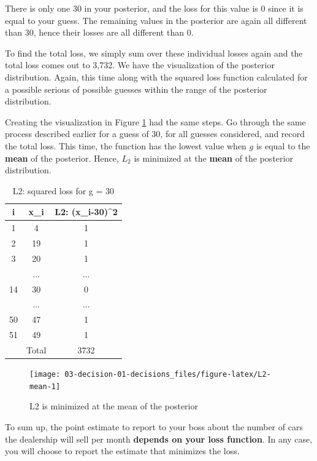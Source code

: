 \documentclass[]{book}
\theoremstyle{definition}
\theoremstyle{definition}
\theoremstyle{definition}
\theoremstyle{remark}
\begin{document}
There is only one 30 in your posterior, and the loss for this value is 0
since it is equal to your guess. The remaining values in the posterior
are again all different than 30, hence their losses are all different
than 0.

To find the total loss, we simply sum over these individual losses again
and the total loss comes out to 3,732. We have the visualization of the
posterior distribution. Again, this time along with the squared loss
function calculated for a possible serious of possible guesses within
the range of the posterior distribution.

Creating the visualization in Figure \ref{fig:L2-mean} had the same
steps. Go through the same process described earlier for a guess of 30,
for all guesses considered, and record the total loss. This time, the
function has the lowest value when \(g\) is equal to the \textbf{mean}
of the posterior. Hence, \(L_2\) is minimized at the \textbf{mean} of
the posterior distribution.

\begin{table}

\caption{\label{tab:L2-table}L2: squared loss for g = 30}
\centering
\begin{tabular}[t]{ccc}
\toprule
i & x\_i & L2: (x\_i-30)\textasciicircum{}2\\
\midrule
1 & 4 & 1\\
2 & 19 & 1\\
3 & 20 & 1\\
 & ... & ...\\
14 & 30 & 0\\
\addlinespace
 & ... & ...\\
50 & 47 & 1\\
51 & 49 & 1\\
 & Total & 3732\\
\bottomrule
\end{tabular}
\end{table}

\begin{figure}

{\centering \texttt{[image: 03-decision-01-decisions\_files/figure-latex/L2-mean-1]} 

}

\caption{L2 is minimized at the mean of the posterior}\label{fig:L2-mean}
\end{figure}

To sum up, the point estimate to report to your boss about the number of
cars the dealership will sell per month \textbf{depends on your loss
function}. In any case, you will choose to report the estimate that
minimizes the loss.
\end{document}
